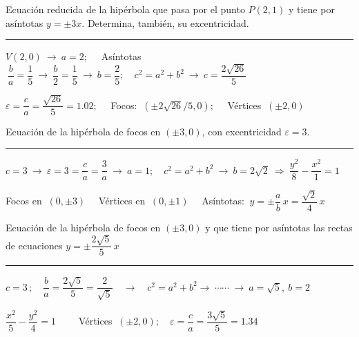 \begin{miejercicio}

Ecuación reducida de la hipérbola que pasa por el punto $P(2,1)$ y tiene por asíntotas $y=\pm 3 x$. Determina, también, su excentricidad.

\rule{250pt}{0.1pt}

\vspace{2mm} $V(2,0) \ \to \ a=2;\quad $ Asíntotas $\ \dfrac b a = \dfrac 1 5 \ \to \ \dfrac b 2=\dfrac 1 5 \ \to \ b=\dfrac 2 5; \quad c^2=a^2+b^2 \ \to \ c=\dfrac{2\sqrt{26}}{5}$  

\vspace{2mm}$\varepsilon = \dfrac c a = \dfrac {\sqrt{26}}{5}=1.02;\quad $ Focos: $\ (\pm 2\sqrt{26}/5, 0);\quad$ Vértices $\ (\pm 2, 0)$
	
\end{miejercicio}


\begin{miejercicio}

Ecuación de la hipérbola de focos en $(\pm 3,0)$, con excentricidad $\varepsilon=3$.

\rule{250pt}{0.1pt}

\vspace{2mm} $c=3 \ \to \ \varepsilon=3=\dfrac c a =\dfrac 3 a \ \to \ a=1;\quad c^2=a^2+b^2 \ \to \ b=2\sqrt{2} \ \Rightarrow \ \dfrac{y^2}{8}-\dfrac{x^2}{1}=1$ 

\vspace{2mm} \textcolor{gris}{ Focos en $\ (0,\pm 3)\quad $ Vértices en $\ (0,\pm 1)\quad $ Asíntotas: $\ y=\pm \dfrac a b \, x = \dfrac {\sqrt{2}}{4}\, x$}
	
\end{miejercicio}


\begin{miejercicio}

Ecuación de la hipérbola de focos en $(\pm 3,0)$ y que tiene por asíntotas las rectas de ecuaciones $y=\pm \dfrac{2\sqrt{5}}{5}\, x$

\rule{250pt}{0.1pt}

\vspace{2mm} $c=3 \, ; \quad \dfrac b a =\dfrac {2\sqrt{5}}{5}= \dfrac {2}{\sqrt{5}} \quad \to \quad c^2=a^2+b^2 \to \  \cdots \cdots \ \to \ a=\sqrt{5},\ b=2$

\vspace{2mm} $\dfrac{x^2}{5}-\dfrac{y^2}{4}=1 \qquad $ \textcolor{gris}{Vértices $\ (\pm 2, 0); \quad \varepsilon=\dfrac ca=\dfrac{3\sqrt{5}}{5}=1.34$ }
	
\end{miejercicio}




